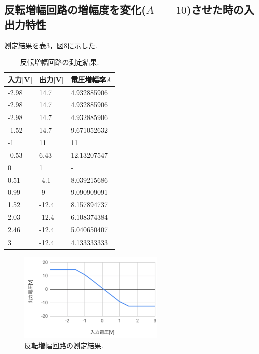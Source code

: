 \documentclass[twocolumn, 10pt,a4j]{jsarticle}
\begin{document}
    \subsection{反転増幅回路の増幅度を変化($A=-10$)させた時の入出力特性}
        測定結果を表3，図8に示した. 
        

                  \begin{table}[H]
                    \centering
                    \footnotesize
                    \caption{反転増幅回路の測定結果.}
                    \label{opeanpu_risouteki_tokusei}
                    \begin{tabular}{lll} \hline
                      入力[V] &出力[V] & 電圧増幅率$A$ \\ \hline
                      -2.98&14.7&4.932885906 \\
                      -2.98&14.7&4.932885906 \\
                      -2.98&14.7&4.932885906 \\
                      -1.52&14.7&9.671052632 \\
                      -1&11&11 \\
                      -0.53&6.43&12.13207547 \\
                      0&1& - \\
                      0.51&-4.1&8.039215686 \\
                      0.99&-9&9.090909091 \\
                      1.52&-12.4&8.157894737 \\
                      2.03&-12.4&6.108374384 \\
                      2.46&-12.4&5.040650407 \\
                      3&-12.4&4.133333333 \\ \hline
                    \end{tabular}
                  \end{table}

                  \begin{figure}[]
                    \begin{center}
                        \includegraphics[width=7cm]{../img/hantenzoufuku_result_2.png}
                        \caption{反転増幅回路の測定結果.}
                    \end{center}
                  \end{figure}
\end{document}
